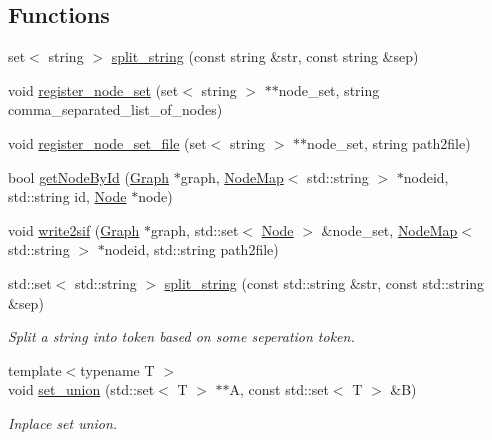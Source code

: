 \subsection*{Functions}
\begin{DoxyCompactItemize}
\item 
set$<$ string $>$ \hyperlink{namespacederegnet_aa12afb18c8703a823fee68c5b9a04bca}{split\+\_\+string} (const string \&str, const string \&sep)
\item 
void \hyperlink{namespacederegnet_a639799db7e485ee8cc15b5933be7b4ba}{register\+\_\+node\+\_\+set} (set$<$ string $>$ $\ast$$\ast$node\+\_\+set, string comma\+\_\+separated\+\_\+list\+\_\+of\+\_\+nodes)
\item 
void \hyperlink{namespacederegnet_a11d599a7ac217876cf35b3f6899532c0}{register\+\_\+node\+\_\+set\+\_\+file} (set$<$ string $>$ $\ast$$\ast$node\+\_\+set, string path2file)
\item 
bool \hyperlink{namespacederegnet_afefc9088a0ea47e8d8c1225b5de29244}{get\+Node\+By\+Id} (\hyperlink{namespacederegnet_a55b76c55bbabc682cbc61f8b9948799e}{Graph} $\ast$graph, \hyperlink{namespacederegnet_ae102b707ae1d6f83c639ece5e0dd5658}{Node\+Map}$<$ std\+::string $>$ $\ast$nodeid, std\+::string id, \hyperlink{namespacederegnet_a744bad34f2de9856d36715a445f027f3}{Node} $\ast$node)
\item 
void \hyperlink{namespacederegnet_a57ac2e918179ec5c93f20248daf39b04}{write2sif} (\hyperlink{namespacederegnet_a55b76c55bbabc682cbc61f8b9948799e}{Graph} $\ast$graph, std\+::set$<$ \hyperlink{namespacederegnet_a744bad34f2de9856d36715a445f027f3}{Node} $>$ \&node\+\_\+set, \hyperlink{namespacederegnet_ae102b707ae1d6f83c639ece5e0dd5658}{Node\+Map}$<$ std\+::string $>$ $\ast$nodeid, std\+::string path2file)
\item 
std\+::set$<$ std\+::string $>$ \hyperlink{namespacederegnet_ae4879ebf699f46d51e52b95f1e6f79da}{split\+\_\+string} (const std\+::string \&str, const std\+::string \&sep)
\begin{DoxyCompactList}\small\item\em Split a string into token based on some seperation token. \end{DoxyCompactList}\item 
{\footnotesize template$<$typename T $>$ }\\void \hyperlink{namespacederegnet_a387095ab9c8084306a874f51433c1dc3}{set\+\_\+union} (std\+::set$<$ T $>$ $\ast$$\ast$A, const std\+::set$<$ T $>$ \&B)
\begin{DoxyCompactList}\small\item\em Inplace set union. \end{DoxyCompactList}\item 
$$
\end{DoxyCompactItemize}
